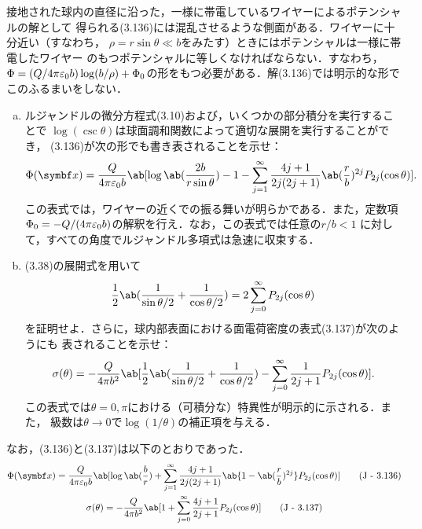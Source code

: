 \begin{bx1}
  接地された球内の直径に沿った，一様に帯電しているワイヤーによるポテンシャルの解として
  得られる(3.136)には混乱させるような側面がある．ワイヤーに十分近い（すなわち，
  $\rho = r\sin\theta \ll b$をみたす）ときにはポテンシャルは一様に帯電したワイヤー
  のもつポテンシャルに等しくなければならない．すなわち，$\Phi = (Q/4\pi\varepsilon_0b)\log(b/\rho) + \Phi_0$の形をもつ必要がある．解(3.136)では明示的な形でこのふるまいをしない．
  \begin{enumerate}[(a)]%
    \item ルジャンドルの微分方程式(3.10)および，いくつかの部分積分を実行することで
      $\log(\csc\theta)$は球面調和関数によって適切な展開を実行することができ，
      (3.136)が次の形でも書き表されることを示せ：
      \begin{gather}%
        \Phi(\bs{x})  = \frac{Q}{4\pi\eps_0 b}\ab[\log\ab(\frac{2b}{r\sin\theta}) - 1 - 
        \sum_{j=1}^\infty\frac{4j+1}{2j(2j+1)} \ab(\frac rb)^{2j} P_{2j}(\cos\theta)
        ].
      \end{gather}%
      この表式では，ワイヤーの近くでの振る舞いが明らかである．また，定数項
      $\Phi_0 = -Q/(4\pi \varepsilon_0 b)$の解釈を行え．なお，この表式では任意の$r / b < 1$
      に対して，すべての角度でルジャンドル多項式は急速に収束する．
    \item (3.38)の展開式を用いて
      \begin{gather}%
        \frac{1}{2} \ab(\frac{1}{\sin\theta/2} + \frac{1}{\cos\theta/2}) = 2 \sum_{j=0}^\infty P_{2j}(\cos\theta)
      \end{gather}%
      を証明せよ．さらに，球内部表面における面電荷密度の表式(3.137)が次のようにも
      表されることを示せ：
      \begin{gather}%
        \sigma(\theta) = - \frac{Q}{4\pi b^2} \ab[\frac{1}{2}\ab(\frac{1}{\sin\theta/2} + \frac{1}{\cos\theta/2}) - \sum_{j=0}^\infty \frac{1}{2j+1}P_{2j}(\cos\theta)].
      \end{gather}%
      この表式では$\theta = 0, \pi$における（可積分な）特異性が明示的に示される．また，
      級数は$\theta \to 0$で$\log(1/\theta)$の補正項を与える．
  \end{enumerate}%
  \tcblower
  なお，(3.136)と(3.137)は以下のとおりであった．
  \begin{gather}%
    \Phi(\bs{x}) = \frac{Q}{4\pi\eps_0 b}\ab[\log \ab(\frac br) +\sum_{j=1}^\infty \frac{4j+1}{2j(2j+1)} \ab\{1- \ab(\frac rb)^{2j}\}P_{2j}(\cos\theta)] \tag{J - 3.136}\\
    \sigma(\theta) = -\frac{Q}{4\pi b^2}\ab[1 + \sum_{j=0}^\infty \frac{4j+1}{2j+1}P_{2j}(\cos\theta)] \tag{J - 3.137}
  \end{gather}%

\end{bx1}

